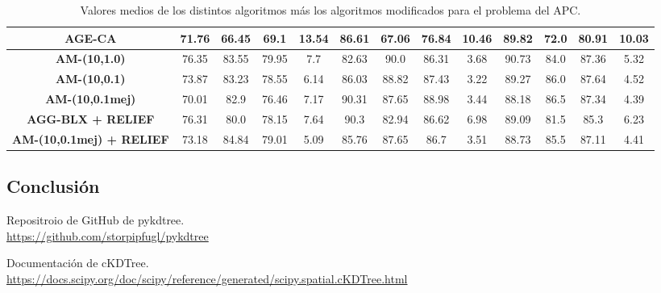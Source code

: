 \documentclass[11pt,a4paper]{article}
\begin{document}
\begin{table}[H]
{\begin{tabular}{c|c|c|c|c|c|c|c|c|c|c|c|c|}
\multicolumn{1}{|c|}{\textbf{AGE-CA}}                  & 71.76             & 66.45                   & 69.1          & 13.54      & 86.61             & 67.06          & 76.84         & 10.46      & 89.82             & 72.0           & 80.91         & 10.03      \\ \hline
\multicolumn{1}{|c|}{\textbf{AM-(10,1.0)}}             & 76.35             & 83.55                   & 79.95         & 7.7        & 82.63             & 90.0           & 86.31         & 3.68       & 90.73             & 84.0           & 87.36         & 5.32       \\ \hline
\multicolumn{1}{|c|}{\textbf{AM-(10,0.1)}}             & 73.87             & 83.23                   & 78.55         & 6.14       & 86.03             & 88.82          & 87.43         & 3.22       & 89.27             & 86.0           & 87.64         & 4.52       \\ \hline
\multicolumn{1}{|c|}{\textbf{AM-(10,0.1mej)}}          & 70.01             & 82.9                    & 76.46         & 7.17       & 90.31             & 87.65          & 88.98         & 3.44       & 88.18             & 86.5           & 87.34         & 4.39       \\ \hline
\multicolumn{1}{|c|}{\textbf{AGG-BLX + RELIEF}}        & 76.31             & 80.0                    & 78.15         & 7.64       & 90.3              & 82.94          & 86.62         & 6.98       & 89.09             & 81.5           & 85.3          & 6.23       \\ \hline
\multicolumn{1}{|c|}{\textbf{AM-(10,0.1mej) + RELIEF}} & 73.18             & 84.84                   & 79.01         & 5.09       & 85.76             & 87.65          & 86.7          & 3.51       & 88.73             & 85.5           & 87.11         & 4.41       \\ \hline
\end{tabular}
}%
\caption{Valores medios de los distintos algoritmos más los algoritmos modificados para el problema del APC.}
\end{table}

\subsection{Conclusión}

\newpage

\begin{thebibliography}{5}

Repositroio de GitHub de pykdtree.
\\\url{https://github.com/storpipfugl/pykdtree}

Documentación de cKDTree.
\\\url{https://docs.scipy.org/doc/scipy/reference/generated/scipy.spatial.cKDTree.html}

\end{thebibliography}
\end{document}
